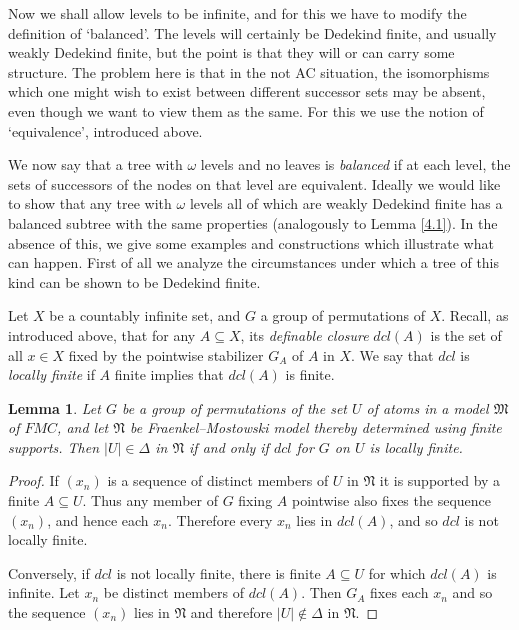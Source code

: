 \documentclass[a4paper,reqno]{amsart}
\numberwithin{equation}{section}
\newtheorem{lemma}[theorem]{Lemma}
\begin{document}
\vspace{.1in}

Now we shall allow levels to be infinite, and for this we have to modify the definition of `balanced'.
The levels will certainly be Dedekind finite, and usually weakly Dedekind finite, but the point is that 
they will or can carry some structure. The problem here is that in the not AC situation, the isomorphisms
which one might wish to exist between different successor sets may be absent, even though we want to view 
them as the same. For this we use the notion of `equivalence', introduced above.

We now say that a tree with $\omega$ levels and no leaves is {\em balanced} if at each level, the sets of 
successors of the nodes on that level are equivalent. Ideally we would like to show that any tree with 
$\omega$ levels all of which are weakly Dedekind finite has a balanced subtree with the same properties
(analogously to Lemma \ref{4.1}). In the absence of this, we give some examples and constructions which
illustrate what can happen. First of all we analyze the circumstances under which a tree of this kind 
can be shown to be Dedekind finite.

Let $X$ be a countably infinite set, and $G$ a group of permutations of $X$. Recall, as introduced above, 
that for any $A \subseteq X$, its {\em definable closure} $dcl(A)$ is the set of all $x \in X$ fixed by the 
pointwise stabilizer $G_A$ of $A$ in $X$. We say that $dcl$ is {\em locally finite} if $A$ finite implies 
that $dcl(A)$ is finite.
 
\begin{lemma} \label{4.5} Let $G$ be a group of permutations of the set $U$ of atoms in a model $\mathfrak M$
of $FMC$, and let $\mathfrak N$ be Fraenkel--Mostowski model thereby determined using finite supports. Then
$|U| \in \Delta$ in $\mathfrak N$ if and only if $dcl$ for $G$ on $U$ is locally finite.   \end{lemma}

\begin{proof} If $(x_n)$ is a sequence of distinct members of $U$ in $\mathfrak N$ it is supported by a 
finite $A \subseteq U$. Thus any member of $G$ fixing $A$ pointwise also fixes the sequence $(x_n)$,
and hence each $x_n$. Therefore every $x_n$ lies in $dcl(A)$, and so $dcl$ is not locally finite.

Conversely, if $dcl$ is not locally finite, there is finite $A \subseteq U$ for which $dcl(A)$ is
infinite. Let $x_n$ be distinct members of $dcl(A)$. Then $G_A$ fixes each $x_n$ and so the sequence
$(x_n)$ lies in $\mathfrak N$ and therefore $|U| \not \in \Delta$ in $\mathfrak N$. \end{proof}
\end{document}
